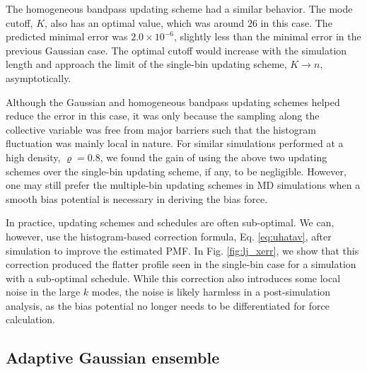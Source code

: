 \documentclass[reprint, superscriptaddress, floatfix]{revtex4-1}
\begin{document}
The homogeneous bandpass updating scheme
had a similar behavior.
%
The mode cutoff, $K$, also has an optimal value,
which was around $26$ in this case.
%
The predicted minimal error was $2.0\times 10^{-6}$,
  slightly less than the minimal error
  in the previous Gaussian case.
%
The optimal cutoff would increase with the simulation length
and approach the limit of the single-bin updating scheme, $K \to n$,
asymptotically.


Although the Gaussian and homogeneous bandpass updating schemes
helped reduce the error in this case,
it was only because
the sampling along the collective variable
was free from major barriers
such that the histogram fluctuation was mainly local in nature.
%
For similar simulations performed at a high density, $\varrho = 0.8$,
we found the gain of using the above two updating schemes
over the single-bin updating scheme, if any, to be negligible.
%
However, one may still prefer the multiple-bin updating schemes
in MD simulations
when a smooth bias potential is necessary in deriving the bias force.

In practice, updating schemes and schedules
are often sub-optimal.
%
We can, however, use the histogram-based correction formula,
Eq. \eqref{eq:uhatav}, after simulation
to improve the estimated PMF.
%
In Fig. \ref{fig:lj_xerr},
we show that this correction produced
the flatter profile seen in the single-bin case
for a simulation with a sub-optimal schedule.
%
While this correction also introduces
some local noise in the large $k$ modes,
the noise is likely harmless
in a post-simulation analysis, as
the bias potential no longer needs to be differentiated
for force calculation.
%





\subsection{\label{sec:potts}
Adaptive Gaussian ensemble}
\end{document}
